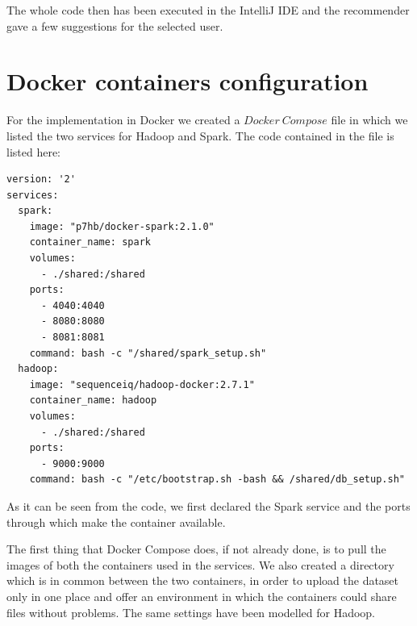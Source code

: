 \documentclass[11pt,a4paper,titlepage]{article}
\begin{document}
The whole code then has been executed in the IntelliJ IDE and the recommender gave a few suggestions for the selected user.

\section{Docker containers configuration}
For the implementation in Docker we created a $Docker ~Compose$ file in which we listed the two services for Hadoop and Spark. The code contained in the file is listed here:

\begin{lstlisting}[style=myBashstyle]
version: '2'
services:
  spark:
    image: "p7hb/docker-spark:2.1.0"
    container_name: spark
    volumes:
      - ./shared:/shared
    ports:
      - 4040:4040
      - 8080:8080
      - 8081:8081
    command: bash -c "/shared/spark_setup.sh"
  hadoop:
    image: "sequenceiq/hadoop-docker:2.7.1"
    container_name: hadoop
    volumes:
      - ./shared:/shared
    ports:
      - 9000:9000
    command: bash -c "/etc/bootstrap.sh -bash && /shared/db_setup.sh"
\end{lstlisting}

As it can be seen from the code, we first declared the Spark service and the ports through which make the container available.

The first thing that Docker Compose does, if not already done, is to pull the images of both the containers used in the services.
We also created a directory which is in common between the two containers, in order to upload the dataset only in one place and offer an environment in which the containers could share files without problems. The same settings have been modelled for Hadoop.
\end{document}
